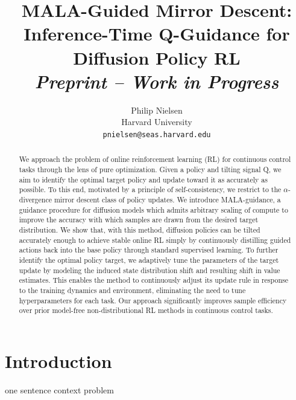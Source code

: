 \documentclass{article}
\title{MALA-Guided Mirror Descent:\\Inference-Time Q-Guidance for Diffusion Policy RL\\[0.5em]\normalsize\textit{Preprint -- Work in Progress}}
\author{%
  Philip Nielsen \\
  Harvard University\\
  \texttt{pnielsen@seas.harvard.edu} \\
}
\theoremstyle{plain}
\theoremstyle{definition}
\theoremstyle{remark}
\begin{document}
\maketitle

\begin{abstract}
We approach the problem of online reinforcement learning (RL) for continuous control tasks through the lens of pure optimization. Given a policy and tilting signal Q, we aim to identify the optimal target policy and update toward it as accurately as possible. 
To this end, motivated by a principle of self-consistency, we restrict to the $\alpha$-divergence mirror descent class of policy updates. 
We introduce MALA-guidance, a guidance procedure for diffusion models which admits arbitrary scaling of compute to improve the accuracy with which samples are drawn from the desired target distribution. We show that, with this method, diffusion policies can be tilted accurately enough to achieve stable online RL simply by continuously distilling guided actions back into the base policy through standard supervised learning. 
To further identify the optimal policy target, we adaptively tune the parameters of the target update by modeling the induced state distribution shift and resulting shift in value estimates. This enables the method to continuously adjust its update rule in response to the training dynamics and environment, eliminating the need to tune hyperparameters for each task.
Our approach significantly improves sample efficiency over prior model-free non-distributional RL methods in continuous control tasks.
\end{abstract}



\section{Introduction}
\label{sec:intro}

one sentence context
problem
\end{document}
